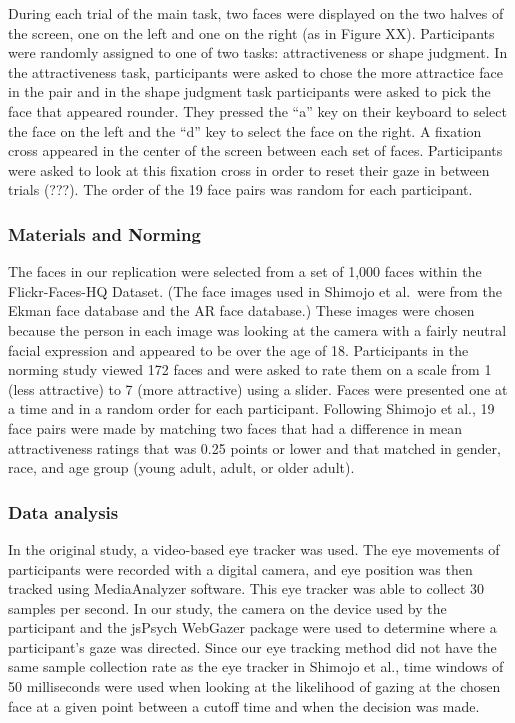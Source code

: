\documentclass[
  man,floatsintext]{apa6}
\begin{document}
During each trial of the main task, two faces were displayed on the two halves of the screen, one on the left and one on the right (as in Figure XX). Participants were randomly assigned to one of two tasks: attractiveness or shape judgment. In the attractiveness task, participants were asked to chose the more attractice face in the pair and in the shape judgment task participants were asked to pick the face that appeared rounder. They pressed the ``a'' key on their keyboard to select the face on the left and the ``d'' key to select the face on the right. A fixation cross appeared in the center of the screen between each set of faces. Participants were asked to look at this fixation cross in order to reset their gaze in between trials (???). The order of the 19 face pairs was random for each participant.

\hypertarget{materials-and-norming}{%
\subsubsection{Materials and Norming}\label{materials-and-norming}}

The faces in our replication were selected from a set of 1,000 faces within the Flickr-Faces-HQ Dataset. (The face images used in Shimojo et al.~were from the Ekman face database and the AR face database.) These images were chosen because the person in each image was looking at the camera with a fairly neutral facial expression and appeared to be over the age of 18. Participants in the norming study viewed 172 faces and were asked to rate them on a scale from 1 (less attractive) to 7 (more attractive) using a slider. Faces were presented one at a time and in a random order for each participant. Following Shimojo et al., 19 face pairs were made by matching two faces that had a difference in mean attractiveness ratings that was 0.25 points or lower and that matched in gender, race, and age group (young adult, adult, or older adult).

\hypertarget{data-analysis-2}{%
\subsubsection{Data analysis}\label{data-analysis-2}}

In the original study, a video-based eye tracker was used. The eye movements of participants were recorded with a digital camera, and eye position was then tracked using MediaAnalyzer software. This eye tracker was able to collect 30 samples per second. In our study, the camera on the device used by the participant and the jsPsych WebGazer package were used to determine where a participant's gaze was directed. Since our eye tracking method did not have the same sample collection rate as the eye tracker in Shimojo et al., time windows of 50 milliseconds were used when looking at the likelihood of gazing at the chosen face at a given point between a cutoff time and when the decision was made.
\end{document}
